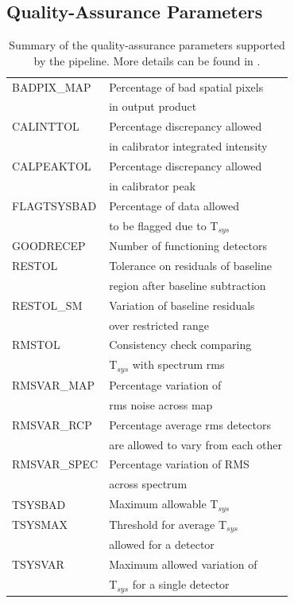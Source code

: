 \documentclass[a4paper,fleqn,usenatbib]{mnras}
\begin{document}
\subsection{Quality-Assurance Parameters \label{sec:qa}}

\begin{table}
  \caption{Summary of the quality-assurance parameters supported by
    the pipeline. More details can be found in \citep{2008JCMTLSQA}.}
\label{tab:qa:params}
\begin{tabular}{ll}
BADPIX\_MAP  & Percentage of bad spatial pixels\\
   & in output product\\
CALINTTOL & Percentage discrepancy allowed\\
    &  in calibrator integrated intensity \\
CALPEAKTOL & Percentage discrepancy allowed\\
    & in calibrator peak\\
FLAGTSYSBAD & Percentage of data allowed \\
   & to be flagged due to T$_{sys}$\\
GOODRECEP & Number of functioning detectors\\
RESTOL & Tolerance on residuals of baseline \\
   & region after baseline subtraction\\
RESTOL\_SM & Variation of baseline residuals \\
  & over restricted range\\
RMSTOL & Consistency check comparing\\
  & T$_{sys}$ with spectrum rms\\
RMSVAR\_MAP & Percentage variation of\\
  & rms noise across map \\
RMSVAR\_RCP &  Percentage average rms detectors\\
  & are allowed to vary from each other\\
RMSVAR\_SPEC & Percentage variation of RMS\\
  & across spectrum \\
TSYSBAD &  Maximum allowable T$_{sys}$\\
TSYSMAX & Threshold for  average T$_{sys}$ \\
  & allowed for a detector\\
TSYSVAR &  Maximum allowed variation of\\
  & T$_{sys}$ for a single detector\\
\end{tabular}
\end{table}
\end{document}
